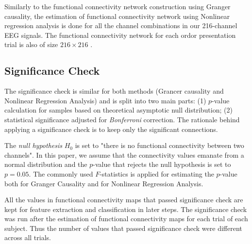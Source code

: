 Similarly to the functional connectivity network construction using Granger causality, the estimation of functional connectivity network using Nonlinear regression analysis is done for all the channel combinations in our 216-channel EEG signals. The functional connectivity network for each ordor presentation trial is also of size $216 \times 216$ .

\subsection{Significance Check}
The significance check is similar for both methods (Grancer causality and Nonlinear Regression Analysis) and is split into two main parts: (1) $p$-value calculation for samples based on theoretical asymptotic null distribution; (2) statistical significance adjusted for \emph{Bonferroni} correction. The rationale behind applying a significance check is to keep only the significant connections. 

The \emph{null hypothesis} $H_0$ is set to "there is no functional connectivity between two channels". In this paper, we assume that the connectivity values emanate from a normal distribution and the $p$-value that rejects the null hypothesis is set to $p=0.05$. The commonly used $F$-statistics is applied for estimating the $p$-value both for Granger Causality and for Nonlinear Regression Analysis.

All the values in functional connectivity maps that passed significance check are kept for feature extraction and classification in later steps. The significance check was run after the estimation of functional connectivity maps for each trial of each subject. Thus the number of values that passed significance check were different across all trials. 




